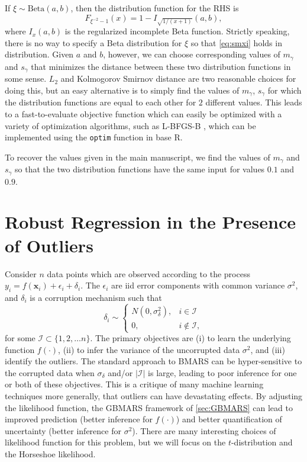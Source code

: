 \documentclass{article} %
\begin{document}
If $\xi \sim \text{Beta}(a, b)$, then the distribution function for the RHS is
$$F_{\xi^{-2}-1}(x) = 1 - I_{\sqrt{1/(x+1)}}(a, b),$$
where $I_x(a, b)$ is the regularized incomplete Beta function. Strictly speaking, there is no way to specify a Beta distribution for $\xi$ so that \cref{eq:smxi} holds in distribution. Given $a$ and $b$, however, we can choose corresponding values of $m_\gamma$ and $s_\gamma$ that minimizes the distance between these two distribution functions in some sense. $L_2$ and Kolmogorov Smirnov distance are two reasonable choices for doing this, but an easy alternative is to simply find the values of $m_\gamma$, $s_\gamma$ for which the distribution functions are equal to each other for $2$ different values. This leads to a fast-to-evaluate objective function which can easily be optimized with a variety of optimization algorithms, such as L-BFGS-B \citep{zhu1997algorithm}, which can be implemented using the \texttt{optim} function in base R. 

To recover the values given in the main manuscript, we find the values of $m_\gamma$ and $s_\gamma$ so that the two distribution functions have the same input for values $0.1$ and $0.9$. 

\section{Robust Regression in the Presence of Outliers}
\label{sec:smoutliers}

Consider $n$ data points which are observed according to the process $y_i = f(\bm x_i) + \epsilon_i + \delta_i$. The $\epsilon_i$ are iid error components with common variance $\sigma^2$, and $\delta_i$ is a corruption mechanism such that
$$
\delta_i \sim \begin{cases}
N(0, \sigma_\delta^2), & i \in \mathcal I \\
0, & i \notin \mathcal I, 
\end{cases}
$$
for some $\mathcal I \subset \{1,2,\ldots n\}$. The primary objectives are (i) to learn the underlying function $f(\cdot)$, (ii) to infer the variance of the uncorrupted data $\sigma^2$, and (iii) identify the outliers. The standard approach to BMARS can be hyper-sensitive to the corrupted data when $\sigma_\delta$ and/or $|\mathcal I|$ is large, leading to poor inference for one or both of these objectives.  This is a critique of many machine learning techniques more generally, that outliers can have devastating effects. By adjusting the likelihood function, the GBMARS framework of \cref{sec:GBMARS} can lead to improved prediction (better inference for $f(\cdot)$) and better quantification of uncertainty (better inference for $\sigma^2$). There are many interesting choices of likelihood function for this problem, but we will focus on the $t$-distribution and the Horseshoe likelihood. 
\end{document}
